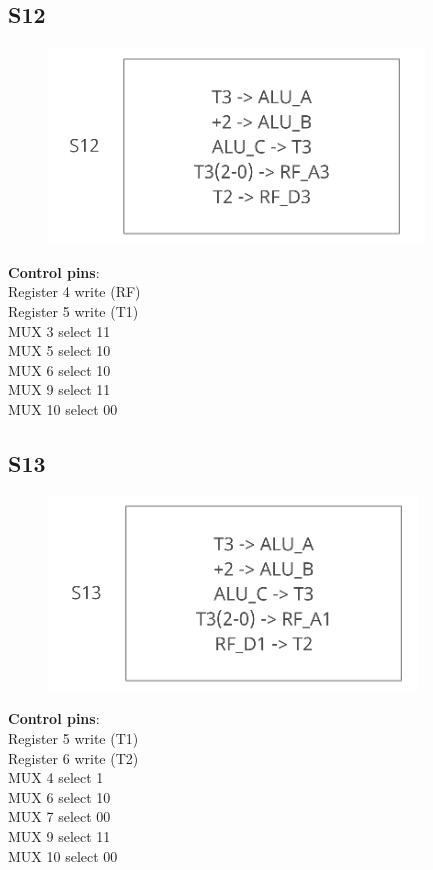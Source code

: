 \documentclass[11pt, fleqn]{article}
\begin{document}
\subsection*{S12}
\begin{figure}[H]
    \centering
    \includegraphics{DataPath/DataPath_S12.PNG}
\end{figure}
\textbf{Control pins}: \\
Register 4 write (RF) \\
Register 5 write (T1) \\
MUX 3 select 11 \\
MUX 5 select 10 \\
MUX 6 select 10 \\
MUX 9 select 11 \\
MUX 10 select 00 \\

\subsection*{S13}
\begin{figure}[H]
    \centering
    \includegraphics{DataPath/DataPath_S13.PNG}
\end{figure}
\textbf{Control pins}: \\
Register 5 write (T1) \\
Register 6 write (T2) \\
MUX 4 select 1 \\
MUX 6 select 10 \\
MUX 7 select 00 \\
MUX 9 select 11 \\
MUX 10 select 00 \\
\end{document}
